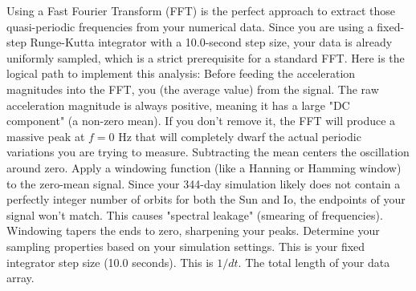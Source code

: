\markdownRendererInterblockSeparator
{}Using a Fast Fourier Transform (FFT) is the perfect approach to extract those quasi-periodic frequencies from your numerical data.\markdownRendererInterblockSeparator
{}Since you are using a fixed-step Runge-Kutta integrator with a 10.0-second step size, your data is already uniformly sampled, which is a strict prerequisite for a standard FFT.\markdownRendererInterblockSeparator
{}Here is the logical path to implement this analysis:\markdownRendererInterblockSeparator
{}\markdownRendererSectionBegin
{}\markdownRendererInterblockSeparator
{}Before feeding the acceleration magnitudes into the FFT, you  (the average value) from the signal.\markdownRendererInterblockSeparator
{}\markdownRendererUlBegin
\markdownRendererUlItem {} The raw acceleration magnitude is always positive, meaning it has a large "DC component" (a non-zero mean). If you don't remove it, the FFT will produce a massive peak at $f = 0$ Hz that will completely dwarf the actual periodic variations you are trying to measure. Subtracting the mean centers the oscillation around zero.\markdownRendererUlItemEnd 
\markdownRendererUlItem {} Apply a windowing function (like a Hanning or Hamming window) to the zero-mean signal. Since your 344-day simulation likely does not contain a perfectly integer number of orbits for both the Sun and Io, the endpoints of your signal won't match. This causes "spectral leakage" (smearing of frequencies). Windowing tapers the ends to zero, sharpening your peaks.\markdownRendererUlItemEnd 
\markdownRendererUlEnd \markdownRendererInterblockSeparator
{}
\markdownRendererSectionEnd \markdownRendererSectionBegin
{}\markdownRendererInterblockSeparator
{}Determine your sampling properties based on your simulation settings.\markdownRendererInterblockSeparator
{}\markdownRendererUlBegin
\markdownRendererUlItem {} This is your fixed integrator step size (10.0 seconds).\markdownRendererUlItemEnd 
\markdownRendererUlItem {} This is $1 / dt$.\markdownRendererUlItemEnd 
\markdownRendererUlItem {} The total length of your data array.\markdownRendererUlItemEnd 
\markdownRendererUlEnd \markdownRendererInterblockSeparator
